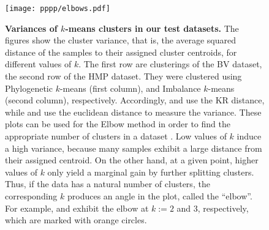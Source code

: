 \begin{figure}[hpbt]
    \centering
    \texttt{[image: pppp/elbows.pdf]}
    \begin{subfigure}{0pt}
        \label{fig:elbows:sub:bv_phylo}
    \end{subfigure}
    \begin{subfigure}{0pt}
        \label{fig:elbows:sub:bv_imb}
    \end{subfigure}
    \begin{subfigure}{0pt}
        \label{fig:elbows:sub:hmp_phylo}
    \end{subfigure}
    \begin{subfigure}{0pt}
        \label{fig:elbows:sub:hmp_imb}
    \end{subfigure}
    \caption[Variances of $k$-means clusters in our test datasets]{
        \textbf{Variances of $k$-means clusters in our test datasets.}
        The figures show the cluster variance,
        that is, the average squared distance of the samples to their assigned cluster centroids,
        for different values of $k$.
        The first row are clusterings of the BV dataset, the second row of the HMP dataset.
        They were clustered using Phylogenetic $k$-means (first column),
        and Imbalance $k$-means (second column), respectively.
        Accordingly,  and  use the KR distance,
        while  and  use the euclidean distance
        to measure the variance.
        These plots can be used for the Elbow method
        in order to find the appropriate number of clusters in a dataset \cite{Thorndike1953}.
        Low values of $k$ induce a high variance, because many samples exhibit a large distance from their assigned centroid.
        On the other hand, at a given point, higher values of $k$ only yield a marginal gain by further splitting clusters.
        Thus, if the data has a natural number of clusters, the corresponding $k$ produces an angle in the plot,
        called the ``elbow''.
        \\
        For example,  and 
        exhibit the elbow at $k:=2$ and $3$, respectively, which are marked with orange circles.
}
\end{figure}
